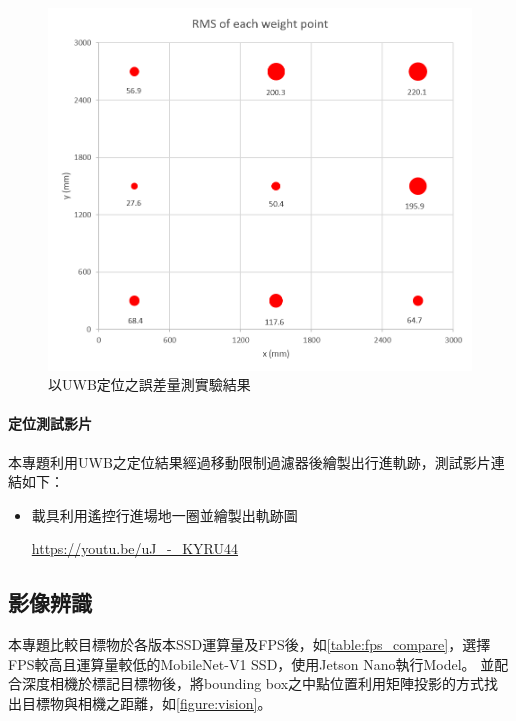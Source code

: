 \begin{figure}[h]
	\centering
	\includegraphics[height=!,width=\linewidth,keepaspectratio=true]
	{images/uwb_bench.png}
	\caption{以UWB定位之誤差量測實驗結果}
	\label{figure:localization_result}
\end{figure}

\paragraph{定位測試影片} 

本專題利用UWB之定位結果經過移動限制過濾器後繪製出行進軌跡，測試影片連結如下：

\begin{itemize}
\item 載具利用遙控行進場地一圈並繪製出軌跡圖

\url{https://youtu.be/uJ_-_KYRU44}

\end{itemize}


\subsection{影像辨識}

本專題比較目標物於各版本SSD運算量及FPS後，如\ref{table:fps_compare}，選擇FPS較高且運算量較低的MobileNet-V1 SSD，使用Jetson Nano執行Model。
並配合深度相機於標記目標物後，將bounding box之中點位置利用矩陣投影的方式找出目標物與相機之距離，如\ref{figure:vision}。

